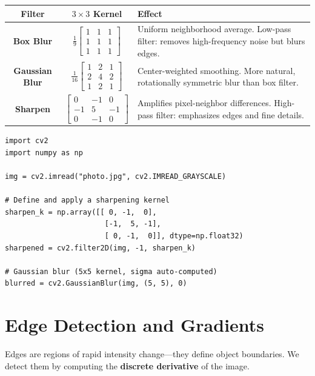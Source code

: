 \begin{table}[h!]
\centering
\renewcommand{\arraystretch}{1.5}
\begin{tabular}{|c|c|p{7.5cm}|}
\hline
\textbf{Filter} & \textbf{$3 \times 3$ Kernel} & \textbf{Effect} \\
\hline
\textbf{Box Blur} &
$\frac{1}{9} \begin{bmatrix} 1 & 1 & 1 \\ 1 & 1 & 1 \\ 1 & 1 & 1 \end{bmatrix}$ &
Uniform neighborhood average. Low-pass filter: removes high-frequency noise but blurs edges. \\
\hline
\textbf{Gaussian Blur} &
$\frac{1}{16} \begin{bmatrix} 1 & 2 & 1 \\ 2 & 4 & 2 \\ 1 & 2 & 1 \end{bmatrix}$ &
Center-weighted smoothing. More natural, rotationally symmetric blur than box filter. \\
\hline
\textbf{Sharpen} &
$\begin{bmatrix} 0 & -1 & 0 \\ -1 & 5 & -1 \\ 0 & -1 & 0 \end{bmatrix}$ &
Amplifies pixel-neighbor differences. High-pass filter: emphasizes edges and fine details. \\
\hline
\end{tabular}
\end{table}

\begin{lstlisting}[style=pythonstyle]
import cv2
import numpy as np

img = cv2.imread("photo.jpg", cv2.IMREAD_GRAYSCALE)

# Define and apply a sharpening kernel
sharpen_k = np.array([[ 0, -1,  0],
                       [-1,  5, -1],
                       [ 0, -1,  0]], dtype=np.float32)
sharpened = cv2.filter2D(img, -1, sharpen_k)

# Gaussian blur (5x5 kernel, sigma auto-computed)
blurred = cv2.GaussianBlur(img, (5, 5), 0)
\end{lstlisting}

\section*{Edge Detection and Gradients}

Edges are regions of rapid intensity change---they define object boundaries. We detect them by computing the \textbf{discrete derivative} of the image.

